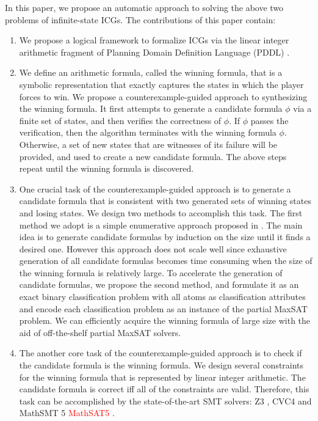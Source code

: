 \documentclass[review]{elsarticle}
\begin{document}
In this paper, we propose an automatic approach to solving the above two problems of infinite-state ICGs.  %
The contributions of this paper contain:
\begin{enumerate}
	\item We propose a logical framework to formalize ICGs via the linear integer arithmetic fragment of Planning Domain Definition Language (PDDL) \cite{FoxL2003}.
	
	\item We define an arithmetic formula, called the winning formula, that is a symbolic representation that exactly captures the states in which the player forces to win.
	We propose a counterexample-guided approach to synthesizing the winning formula.
	It first attempts to generate a candidate formula $\phi$ via a finite set of states, and then verifies the	correctness of $\phi$.
	If $\phi$ passes the verification, then the algorithm terminates with the winning formula $\phi$. Otherwise, a set of new	states that are witnesses of its failure will be provided, and used to create a new candidate formula.
	The above steps repeat until the winning formula is discovered.
		
	\item One crucial task of the counterexample-guided approach is to generate a candidate formula that is consistent with two generated sets of winning states and losing states.
	We design two methods to accomplish this task.	
	The first method we adopt is a simple enumerative approach proposed in \cite{UduRDMMA2013}.
	The main idea is to generate candidate formulas by induction on the	size until it finds a desired one.
	However this approach does not scale well since exhaustive generation of all candidate formulas becomes time consuming when the size of the winning formula is relatively large.
	To accelerate the generation of candidate formulas, we propose the second method, and formulate it as an exact binary classification problem with all atoms as classification attributes and encode each classification problem as an instance of the partial MaxSAT problem.
	We can efficiently acquire the winning formula of large size with the aid of off-the-shelf partial MaxSAT solvers.
	
	\item The another core task of the counterexample-guided approach is to check if the candidate formula is the winning formula.
	We design several constraints for the winning formula that is represented by linear integer	arithmetic.
	The candidate formula is correct iff all of the constraints are valid.
	Therefore, this task can be accomplished by the state-of-the-art SMT solvers: Z3 \cite{MouB2008}, CVC4 \cite{BarCDHJKRT2011} and MathSMT 5 \textcolor{red}{MathSAT5} \cite{CimGSS2013}.
	

\end{enumerate}
\end{document}
